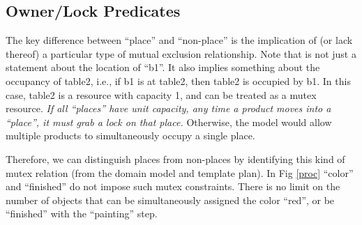
\subsection{Owner/Lock Predicates} %
\label{sec-2-3}

% 




The key difference between ``place'' and ``non-place''
is the implication of (or lack thereof) a particular type of mutual exclusion relationship.
Note that  is not just a statement about the location of ``b1''.
It also implies something about the occupancy of table2, i.e., if b1 is
at table2, then table2 is occupied by b1.
In this case, table2 is a resource with capacity 1, and can be treated as a mutex resource.
{\em If all ``places'' have unit capacity, any time a product moves
into a ``place'', it must grab a lock on that place.}
Otherwise, the model would allow multiple products to simultaneously occupy a single
place.

Therefore, we can distinguish places from non-places
by identifying this kind of mutex relation (from the domain model and template plan).
In %
Fig \ref{proc} ``color''  and ``finished'' 
do not impose such
mutex constraints. There is no limit on the number of objects that can be simultaneously assigned the color ``red'', or be ``finished'' with the ``painting'' step.

